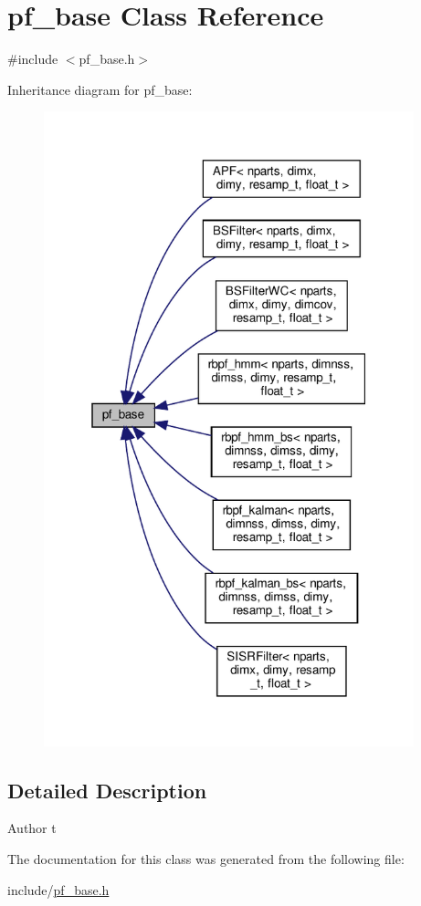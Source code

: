 \hypertarget{classpf__base}{}\section{pf\+\_\+base Class Reference}
\label{classpf__base}


{\ttfamily \#include $<$pf\+\_\+base.\+h$>$}



Inheritance diagram for pf\+\_\+base\+:
\nopagebreak
\begin{figure}[H]
\begin{center}
\leavevmode
\includegraphics[width=304pt]{classpf__base__inherit__graph}
\end{center}
\end{figure}


\subsection{Detailed Description}
\begin{DoxyAuthor}{Author}
t 
\end{DoxyAuthor}


The documentation for this class was generated from the following file\+:\begin{DoxyCompactItemize}
\item 
include/\hyperlink{pf__base_8h}{pf\+\_\+base.\+h}\end{DoxyCompactItemize}
